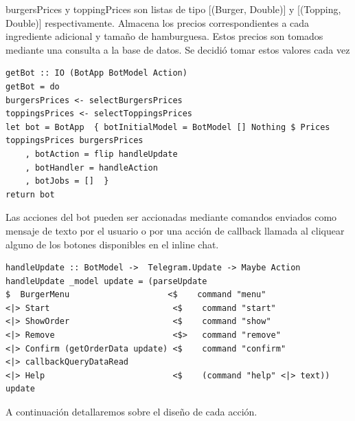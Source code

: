\documentclass[a4paper,12pt]{article}
\begin{document}
burgersPrices y toppingPrices son listas de tipo  [(Burger, Double)] y [(Topping, Double)] respectivamente. Almacena los precios correspondientes a cada ingrediente adicional y tamaño de hamburguesa. Estos precios son tomados mediante una consulta a la base de datos. Se decidió tomar estos valores cada vez 

\begin{verbatim}
getBot :: IO (BotApp BotModel Action)
getBot = do
burgersPrices <- selectBurgersPrices
toppingsPrices <- selectToppingsPrices
let bot = BotApp  { botInitialModel = BotModel [] Nothing $ Prices toppingsPrices burgersPrices
	, botAction = flip handleUpdate
	, botHandler = handleAction
	, botJobs = []  }
return bot    
\end{verbatim}
	
Las acciones del bot pueden ser accionadas mediante comandos enviados como mensaje de texto por el usuario o por una acción de callback llamada al cliquear alguno de los botones disponibles en el inline chat.

\begin{verbatim}
handleUpdate :: BotModel ->  Telegram.Update -> Maybe Action
handleUpdate _model update = (parseUpdate
$  BurgerMenu                    <$    command "menu" 
<|> Start                         <$    command "start" 
<|> ShowOrder                     <$    command "show" 
<|> Remove                        <$>   command "remove"
<|> Confirm (getOrderData update) <$    command "confirm"
<|> callbackQueryDataRead
<|> Help                          <$    (command "help" <|> text)) update
\end{verbatim}

\pagebreak

A continuación detallaremos sobre el diseño de cada acción.
\end{document}
